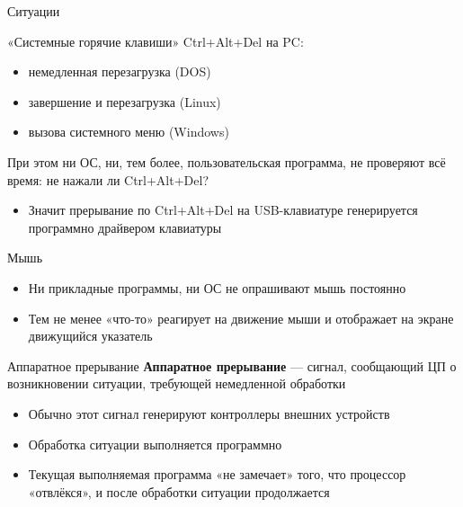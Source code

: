 \documentclass[xetex,aspectratio=43]{beamer}
\begin{document}
\begin{frame}{Ситуации}
	\begin{block}{«Системные горячие клавиши»}
		Ctrl+Alt+Del на PC:
		
		\begin{itemize}
			\tightlist
			\item
			немедленная перезагрузка (DOS)
			\item
			завершение и перезагрузка (Linux)
			\item
			вызова системного меню (Windows)
		\end{itemize}
		
		При этом ни ОС, ни, тем более, пользовательская программа, не проверяют всё время: не нажали ли Ctrl+Alt+Del?

		\pause
				\begin{itemize}
	\item
	Значит прерывание по Ctrl+Alt+Del на USB-клавиатуре генерируется
	программно драйвером клавиатуры
\end{itemize}
		
	\end{block}

		\pause
	
	\begin{block}{Мышь}
		\begin{itemize}
			\tightlist
			\item
			Ни прикладные программы, ни ОС не опрашивают мышь постоянно
			\item
			Тем не менее «что-то» реагирует на движение мыши и отображает на
			экране движущийся указатель
		\end{itemize}
	\end{block}
\end{frame}

\begin{frame}
	\begin{block}{Аппаратное прерывание}
		\textbf{Аппаратное прерывание} --- сигнал, сообщающий ЦП о возникновении
		ситуации, требующей немедленной обработки
		
		\begin{itemize}
			\tightlist
			\item
			Обычно этот сигнал генерируют контроллеры внешних устройств
			\item
			Обработка ситуации выполняется программно
			\item
			Текущая выполняемая программа «не замечает» того, что процессор
			«отвлёкся», и после обработки ситуации продолжается
		\end{itemize}
	\end{block}
\end{frame}
\end{document}
